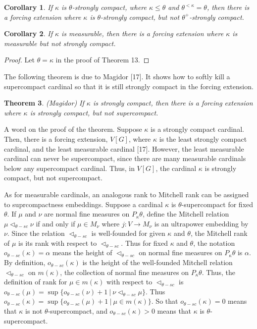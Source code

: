 \documentclass[10pt,leqno]{amsart}
\newtheorem{theorem}{Theorem}[]
\newtheorem{corollary}[theorem]{Corollary}
\begin{document}
\begin{corollary} If $\kappa$ is $\theta$-strongly compact, where $\kappa \le \theta$ and $\theta^{<\kappa} = \theta$, then there is a forcing extension where $\kappa$ is $\theta$-strongly compact, but not $\theta^+$-strongly compact.
\end{corollary}

\begin{corollary} If $\kappa$ is measurable, then there is a forcing extension where $\kappa$ is measurable but not strongly compact. 
\end{corollary}

\begin{proof} Let $\theta = \kappa$ in the proof of Theorem 13.
\end{proof}

The following theorem is due to Magidor [17]. It shows how to softly kill a supercompact cardinal so that it is still strongly compact in the forcing extension.

\begin{theorem} (Magidor) If $\kappa$ is strongly compact, then there is a forcing extension where $\kappa$ is strongly compact, but not supercompact.
\end{theorem}

A word on the proof of the theorem. Suppose $\kappa$ is a strongly compact cardinal. Then, there is a forcing extension, $V[G]$, where $\kappa$ is the least strongly compact cardinal, and the least measurable cardinal [17]. However, the least measurable cardinal can never be supercompact, since there are many measurable cardinals below any supercompact cardinal. Thus, in $V[G]$, the cardinal $\kappa$ is strongly compact, but not supercompact. 

As for measurable cardinals, an analogous rank to Mitchell rank can be assigned to suprcompactness embeddings. Suppose a cardinal $\kappa$ is $\theta$-supercompact for fixed $\theta$. If $\mu$ and $\nu$ are normal fine measures on $P_{\kappa}\theta$, define the Mitchell relation $\mu \vartriangleleft_{\theta-sc} \nu$ if and only if $\mu \in M_{\nu}$ where $j:V \to M_{\nu}$ is an ultrapower embedding by $\nu$. Since the relation $\vartriangleleft_{\theta-sc}$ is well-founded for given $\kappa$ and $\theta$, the Mitchell rank of $\mu$ is its rank with respect to $\vartriangleleft_{\theta-sc}$. Thus for fixed $\kappa$ and $\theta$, the notation $o_{\theta-sc}(\kappa) = \alpha$ means the height of $\vartriangleleft_{\theta-sc}$ on normal fine measures on $P_{\kappa}\theta$ is $\alpha$. By definition, $o_{\theta-sc}(\kappa)$ is the height of the well-founded Mitchell relation $\vartriangleleft_{\theta-sc}$ on $m(\kappa)$, the collection of normal fine measures on $P_{\kappa}\theta$. Thus, the definition of rank for $\mu \in m(\kappa)$ with respect to $\vartriangleleft_{\theta-sc}$ is $o_{\theta-sc}(\mu) = \sup\{o_{\theta-sc}(\nu) + 1 \ | \ \nu \vartriangleleft_{\theta-sc} \mu \}$. Thus $o_{\theta-sc}(\kappa) = \sup\{o_{\theta-sc}(\mu) + 1 \ | \ \mu \in m(\kappa) \}$. So that $o_{\theta-sc}(\kappa) = 0$ means that $\kappa$ is not $\theta$-supercompact, and $o_{\theta-sc}(\kappa) > 0$ means that $\kappa$ is $\theta$-supercompact. 
\end{document}
